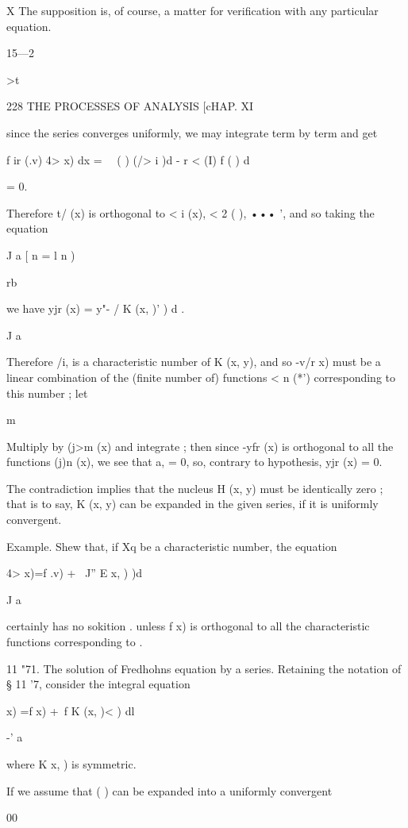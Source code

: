 {X The supposition is, of course, a matter for verification with any particular equation. 

15—2 



>t\ 



228 THE PROCESSES OF ANALYSIS [cHAP. XI 

since the series converges uniformly, we may integrate term by term and get 

f ir (.v) 4>   x) dx =  \ \  ( ) (/>  i )d - r <   (I) f ( ) d  

= 0. 

Therefore t/  (x) is orthogonal to < i (x), < 2 ( ), ••• ', and so taking the 
equation 

J a [ n = l  n ) 

rb 

we have yjr (x) = y"- / K (x,  )'    ) d . 

J a 

Therefore /i, is a characteristic number of K (x, y), and so -v/r  x) must be 
a linear combination of the (finite number of) functions < n (*') corresponding 
to this number ; let 

m 

Multiply by (j>m (x) and integrate ; then since -yfr (x) is orthogonal to all the 
functions (j)n (x), we see that a,  = 0, so, contrary to hypothesis, yjr (x) = 0. 

The contradiction implies that the nucleus H (x, y) must be identically 
zero ; that is to say, K (x, y) can be expanded in the given series, if it is 
uniformly convergent. 

Example. Shew that, if Xq be a characteristic number, the equation 

4> x)=f .v) + \ J'' E x,  )   )d  

J a 

certainly has no sokition . unless f x) is orthogonal to all the characteristic functions 
corresponding to .  

11 "71. The solution of Fredhohns equation by a series. 
Retaining the notation of § 11 '7, consider the integral equation 

   x) =f x) +\ f K (x,  )<   ) dl 

-' a 

where K  x,  ) is symmetric. 

If we assume that   ( ) can be expanded into a uniformly convergent 

00 

}
